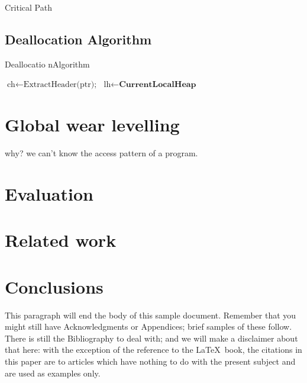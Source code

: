 \documentclass{vldb}
\begin{document}
Critical Path

\subsection{Deallocation Algorithm}


\begin{algorithm}
\caption{Deallocatio nAlgorithm}\label{euclid}
\begin{algorithmic}[1]

\State $\text{ch} \gets \text{ExtractHeader(ptr);}$
\State $\text{lh} \gets \textbf{CurrentLocalHeap}$

\State {}
\Else
\State {}
\EndIf

\EndProcedure
\end{algorithmic}
\end{algorithm}


\section{Global wear levelling}

why? we can’t know the access pattern of a program.

\section{Evaluation}

\section{Related work}


\section{Conclusions}
This paragraph will end the body of this sample document.
Remember that you might still have Acknowledgments or
Appendices; brief samples of these
follow.  There is still the Bibliography to deal with; and
we will make a disclaimer about that here: with the exception
of the reference to the \LaTeX\ book, the citations in
this paper are to articles which have nothing to
do with the present subject and are used as
examples only.

\balance
\end{document}
